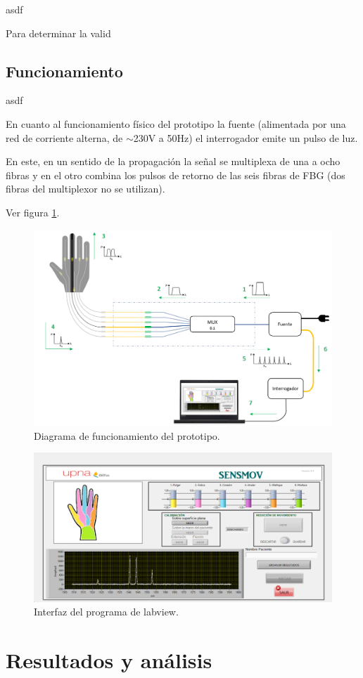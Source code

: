 asdf




Para determinar la valid


\subsection{Funcionamiento}
\label{sec:funcionamiento3}
asdf

En cuanto al funcionamiento físico del prototipo la fuente  (alimentada por una red de corriente alterna, de $\sim$230V a 50Hz) el interrogador emite un pulso de luz. 



En este, en un sentido de la propagación la señal se multiplexa de una a ocho fibras y en el otro combina los pulsos de retorno de las seis fibras de FBG (dos fibras del multiplexor no se utilizan). 

Ver figura \ref{fig:diagramaFBGfuncionamiento}.

\begin{figure}[H]
	\centering
	\includegraphics[width=1\textwidth]{./img/diagramaFBGfuncionamiento}
	\caption{Diagrama de funcionamiento del prototipo.} \label{fig:diagramaFBGfuncionamiento}
\end{figure}



\begin{figure}[H]
	\centering
	\includegraphics[width=1\textwidth]{./img/interfazSM}
	\caption{Interfaz del programa de labview.}
	\label{fig:interfaz}
\end{figure}




\section{Resultados y análisis}
\label{sec:resultados3}

